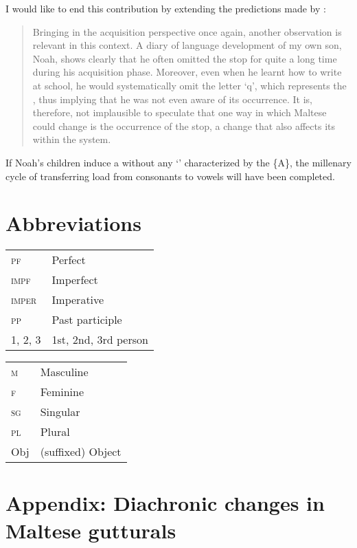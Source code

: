 \documentclass[output=paper]{langsci/langscibook}
\begin{document}
I would like to end this contribution by extending the  predictions made by \citet[99]{Fabri2011}:

\begin{quote}
Bringing in the acquisition perspective once again, another observation is relevant in this context. A diary of language development of my own son, Noah, shows clearly that he often omitted the  stop for quite a long time during his acquisition phase. Moreover, even when he learnt how to write at school, he would systematically omit the letter ‘q’, which represents the , thus implying that he was not even aware of its occurrence. It is, therefore, not implausible to speculate that one way in which Maltese could change is the occurrence of the  stop, a change that also affects its  within the  system.
\end{quote}

If Noah's children induce a  without any ‘’  characterized by the  \{A\}, the millenary cycle of transferring  load from consonants to vowels will have been completed. 


\section*{Abbreviations}
\begin{tabularx}{.45\textwidth}{lQ}
\textsc{pf} & Perfect\\
\textsc{\textsc{impf}} & Imperfect\\
\textsc{imper} & Imperative\\
\textsc{pp}&  Past participle    \\ 
1, 2, 3&   1st, 2nd, 3rd person\\
\end{tabularx}
\begin{tabularx}{.45\textwidth}{lQ}
\textsc{m}&Masculine\\
\textsc{f} & Feminine\\   
\textsc{sg}& Singular\\
\textsc{pl} & Plural\\
Obj&   (suffixed) Object \\
\end{tabularx}

\clearpage 
\section*{Appendix: Diachronic changes in Maltese gutturals}
 
\end{document}
